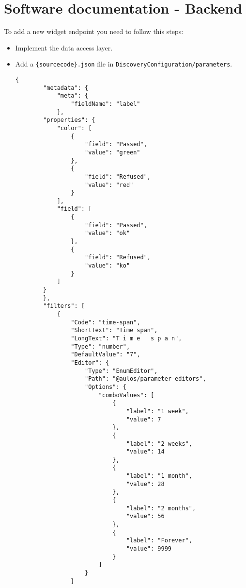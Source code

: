 \section{Software documentation - Backend}
To add a new widget endpoint you need to follow this steps:
\begin{itemize}
    \item Implement the data access layer.
    \item Add a \verb|{sourcecode}.json| file in \verb|DiscoveryConfiguration/parameters|.
    \begin{lstlisting}[caption={{sourcecode}.json example}, style=javaScriptCode]
    {
        "metadata": {
            "meta": {
                "fieldName": "label"
            },
        "properties": {
            "color": [
                {
                    "field": "Passed",
                    "value": "green"
                },
                {
                    "field": "Refused",
                    "value": "red"
                }
            ],
            "field": [
                {
                    "field": "Passed",
                    "value": "ok"
                },
                {
                    "field": "Refused",
                    "value": "ko"
                }
            ]
        }
        },
        "filters": [
            {
                "Code": "time-span",
                "ShortText": "Time span",
                "LongText": "T i m e   s p a n",
                "Type": "number",
                "DefaultValue": "7",
                "Editor": {
                    "Type": "EnumEditor",
                    "Path": "@aulos/parameter-editors",
                    "Options": {
                        "comboValues": [
                            {
                                "label": "1 week",
                                "value": 7
                            },
                            {
                                "label": "2 weeks",
                                "value": 14
                            },
                            {
                                "label": "1 month",
                                "value": 28
                            },
                            {
                                "label": "2 months",
                                "value": 56
                            },
                            {
                                "label": "Forever",
                                "value": 9999
                            }
                        ]
                    }
                }

\end{lstlisting}
\end{itemize}
